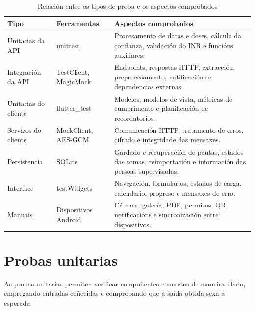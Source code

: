 \begin{table}[htbp]
    \centering
    \small
    \caption{Relación entre os tipos de proba e os aspectos comprobados}
    \label{tab:matriz-probas}

    \setlength{\tabcolsep}{5pt}
    \renewcommand{\arraystretch}{1.15}

    \begin{tabularx}{\textwidth}{
        >{\raggedright\arraybackslash}p{}
        >{\raggedright\arraybackslash}p{}
        >{\raggedright\arraybackslash}X
    }
        \hline
        \textbf{Tipo} &
        \textbf{Ferramentas} &
        \textbf{Aspectos comprobados} \\
        \hline

        Unitarias da API &
        unittest &
        Procesamento de datas e doses, cálculo da confianza, validación do INR e funcións auxiliares. \\

        Integración da API &
        TestClient, MagicMock &
        Endpoints, respostas HTTP, extracción, preprocesamento, notificacións e dependencias externas. \\

        Unitarias do cliente &
        flutter\_test &
        Modelos, modelos de vista, métricas de cumprimento e planificación de recordatorios. \\

        Servizos do cliente &
        MockClient, AES-GCM &
        Comunicación HTTP, tratamento de erros, cifrado e integridade das mensaxes. \\

        Persistencia &
        SQLite &
        Gardado e recuperación de pautas, estados das tomas, reimportación e información das persoas supervisadas. \\

        Interface &
        testWidgets &
        Navegación, formularios, estados de carga, calendario, progreso e mensaxes de erro. \\

        Manuais &
        Dispositivos Android &
        Cámara, galería, PDF, permisos, QR, notificacións e sincronización entre dispositivos. \\
        \hline
    \end{tabularx}
\end{table}

\section{Probas unitarias}
As probas unitarias permiten verificar compoñentes concretos de maneira illada, empregando entradas coñecidas e comprobando que a saída obtida sexa a esperada.

